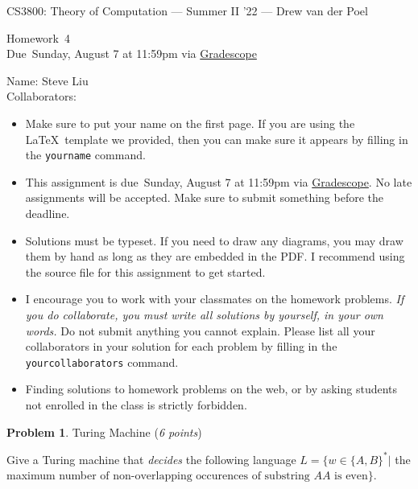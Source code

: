 \documentclass[11pt]{article}
\newcommand{\yourname}{}
\newcommand{\yourcollaborators}{}
\theoremstyle{definition}
\newcommand{\instructor}{Drew van der Poel}
\newcommand{\hwnum}{4}
\newcommand{\hwdue}{Sunday, August 7 at 11:59pm via \href{https://www.gradescope.com/courses/406943}{Gradescope}}
\theoremstyle{theorem}
\newtheorem{prob}{Problem}
\begin{document}
{\Large 
\begin{center}{CS3800: Theory of Computation} --- Summer II '22 --- \instructor \end{center}}
{\large
\vspace{10pt}
\noindent Homework~\hwnum \vspace{2pt}\\
Due~\hwdue}

\bigskip
{\large
\noindent Name: \yourname Steve Liu  \vspace{2pt}\\ Collaborators: \yourcollaborators}

\vspace{15pt}
\begin{itemize}

\item Make sure to put your name on the first page.  If you are using the \LaTeX~template we provided, then you can make sure it appears by filling in the \texttt{yourname} command.

\item This assignment is due~\hwdue.  No late assignments will be accepted.  Make sure to submit something before the deadline.

\item Solutions must be typeset.  If you need to draw any diagrams, you may draw them by hand as long as they are embedded in the PDF.  I recommend using the source file for this assignment to get started.

\item I encourage you to work with your classmates on the homework problems. \emph{If you do collaborate, you must write all solutions by yourself, in your own words.}  Do not submit anything you cannot explain.  Please list all your collaborators in your solution for each problem by filling in the \texttt{yourcollaborators} command.

\item Finding solutions to homework problems on the web, or by asking students not enrolled in the class is strictly forbidden.

\end{itemize}



\newpage

\begin{prob} Turing Machine (\emph{6 points})\end{prob}

Give a Turing machine that \emph{decides} the following language $L = \{ w \in \{A,B\}^* |$ the maximum number 
$ \text{of non-overlapping occurences of substring~} AA \text{~is even}\}$.
\end{document}
